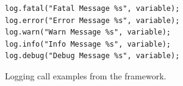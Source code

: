 \begin{figure}[H]
\vspace*{1em}
\begin{center}
\begin{minipage}{4in}
\begin{lstlisting}[frame=single,numbers=none]
log.fatal("Fatal Message %s", variable);
log.error("Error Message %s", variable);
log.warn("Warn Message %s", variable);
log.info("Info Message %s", variable);
log.debug("Debug Message %s", variable);
\end{lstlisting}
\end{minipage}
\caption{Logging call examples from the  framework.\label{fig:chap1_logCode}\label{fig:log-call-examples}}
\end{center}
\end{figure}

%
%
%



